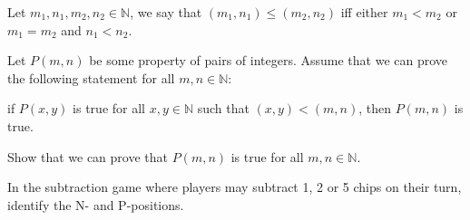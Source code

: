\documentclass[addpoints]{exam}
\begin{document}
  \pagestyle{headandfoot}
  \runningheadrule

  \firstpagefooter{}{}{}
  \runningfooter{}{}{}
  \begin{flushright}

    \vspace{0.2in}
  \end{flushright}

  \begin{questions}
    \question[10]
      Let $m_1, n_1, m_2, n_2 \in \mathbb{N}$, we say that $(m_1, n_1) \le (m_2, n_2)$
			iff either $m_1 < m_2$ or $m_1 = m_2$ and $n_1 < n_2$.
			
			Let $P(m, n)$ be some property of pairs of integers. Assume that we can prove
			the following statement for all $m, n \in \mathbb{N}$:
			\begin{center}
			  if $P(x, y)$ is true for all $x, y \in \mathbb{N}$ such that 
			  $(x, y) < (m, n)$, then $P(m, n)$ is true.
			\end{center}
			Show that we can prove that $P(m, n)$ is true for all $m, n \in \mathbb{N}$.

      \begin{solution}[\stretch{1}]
      \end{solution}
      \newpage
    \question[10]
      In the subtraction game where players may subtract 1, 2 or 5 chips on their
			turn, identify the N- and P-positions.

      \begin{solution}[\stretch{1}]
      \end{solution}
      \newpage
  \end{questions}
\end{document}
